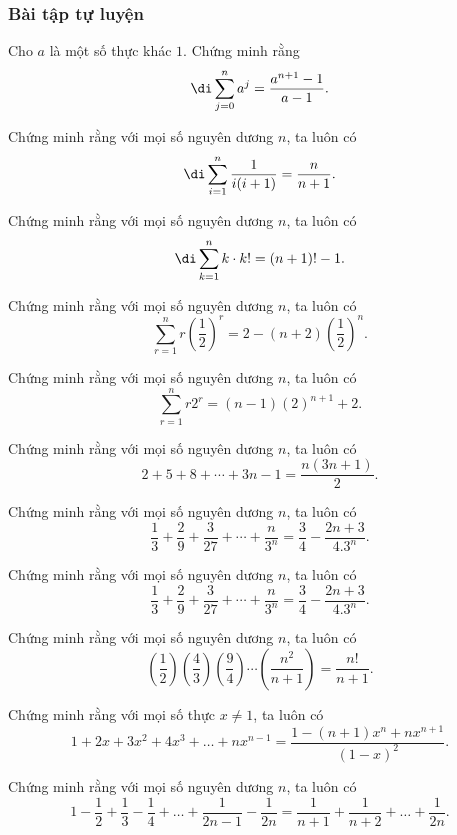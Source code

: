 \subsubsection*{Bài tập tự luyện}
\begin{bai}
Cho $a$ là một số thực khác $1.$ Chứng minh rằng
$$\di \sum_{j=0}^{n} a^{j}=\dfrac{a^{n+1}-1}{a-1}.$$
\end{bai}
\begin{bai}
Chứng minh rằng với mọi số nguyên dương $n$, ta luôn có $$\di \sum_{i=1}^{n} \dfrac{1}{i(i+1)}=\dfrac{n}{n+1}.$$
\end{bai}
\begin{bai}
Chứng minh rằng với mọi số nguyên dương $n$, ta luôn có $$\di \sum_{k=1}^{n} k \cdot k !=(n+1) !-1.$$
\end{bai}
\begin{bai}
Chứng minh rằng với mọi số nguyên dương $n$, ta luôn có 
\[\sum_{r=1}^{n} r\left(\dfrac{1}{2}\right)^{r}=2-(n+2)\left(\dfrac{1}{2}\right)^{n}.\]
\end{bai}
\begin{bai}
Chứng minh rằng với mọi số nguyên dương $n$, ta luôn có 
\[\sum_{r=1}^{n} r 2^{r}=(n-1)(2)^{n+1}+2.\]
\end{bai}
\begin{bai}
Chứng minh rằng với mọi số nguyên dương $n$, ta luôn có 
\[2+5+8+\cdots+3n-1=\dfrac{n(3n+1)}{2}.\]
\end{bai}
\begin{bai}
Chứng minh rằng với mọi số nguyên dương $n$, ta luôn có 
\[\dfrac{1}{3}+\dfrac{2}{9}+\dfrac{3}{27}+\cdots+\dfrac{n}{3^n}=\dfrac{3}{4}-\dfrac{2n+3}{4.3^n}.\]
\end{bai}
\begin{bai}
Chứng minh rằng với mọi số nguyên dương $n$, ta luôn có 
\[\dfrac{1}{3}+\dfrac{2}{9}+\dfrac{3}{27}+\cdots+\dfrac{n}{3^n}=\dfrac{3}{4}-\dfrac{2n+3}{4.3^n}.\]
\end{bai}
\begin{bai}
Chứng minh rằng với mọi số nguyên dương $n$, ta luôn có 
\[\left( {\dfrac{1}{2}} \right)\left( {\dfrac{4}{3}} \right)\left( {\dfrac{9}{4}} \right) \cdots \left( {\dfrac{{{n^2}}}{{n + 1}}} \right) = \dfrac{{n!}}{{n + 1}}.\]
\end{bai}
\begin{bai}
Chứng minh rằng với mọi số thực $x\ne 1$, ta luôn có
\[1+2 x+3 x^{2}+4 x^{3}+\ldots+n x^{n-1}=\dfrac{1-(n+1) x^{n}+n x^{n+1}}{(1-x)^{2}}.\]
\end{bai}
\begin{bai}
Chứng minh rằng với mọi số nguyên dương $n$, ta luôn có 
\[1-\dfrac{1}{2}+\dfrac{1}{3}-\dfrac{1}{4}+\ldots+\dfrac{1}{2 n-1}-\dfrac{1}{2 n}=\dfrac{1}{n+1}+\dfrac{1}{n+2}+\ldots+\dfrac{1}{2 n}.\]
\end{bai}
